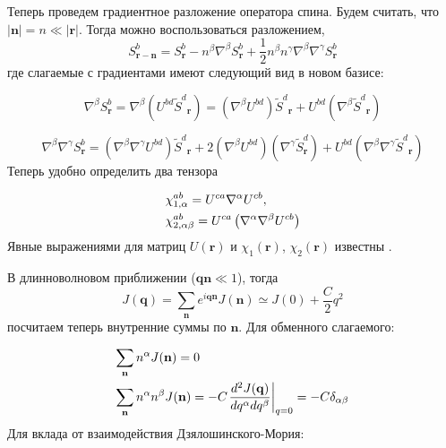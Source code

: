 \documentclass[a4paper,article,14pt]{extarticle}
\begin{document}
Теперь проведем градиентное разложение оператора спина. Будем считать, что $|\mathbf{n}|=n \ll |\mathbf{r}|$. Тогда можно воспользоваться разложением, $${S}_{{\mathbf{r}} - {\mathbf{n}}}^b = {S}_{\mathbf{r}}^b - {n^\beta }{\nabla ^\beta }{S}_{\mathbf{r}}^b + \frac{1}{2}{n^\beta }{n^\gamma }{\nabla ^\beta }{\nabla ^\gamma }{S}_{\mathbf{r}}^b$$ где слагаемые с градиентами имеют следующий вид в новом базисе:

\[{\nabla ^\beta }S_{\mathbf{r}}^b = {\nabla ^\beta }\left( {{U^{bd}}{{\tilde S}^d}_{\mathbf{r}}} \right) = \left( {{\nabla ^\beta }{U^{bd}}} \right){{\tilde S}^d}_{\mathbf{r}} + {U^{bd}}\left( {{\nabla ^\beta }{{\tilde S}^d}_{\mathbf{r}}} \right)\]

	
\[{\nabla ^\beta }{\nabla ^\gamma }S_{\mathbf{r}}^b = \left( {{\nabla ^\beta }{\nabla ^\gamma }{U^{bd}}} \right){\tilde S^d}_{\mathbf{r}} + 2\left( {{\nabla ^\beta }{U^{bd}}} \right)\left( {{\nabla ^\gamma }\tilde S_{\mathbf{r}}^d} \right) + {U^{bd}}\left( {{\nabla ^\beta }{\nabla ^\gamma }{{\tilde S}^d}_{\mathbf{r}}} \right)\]
Теперь удобно определить два тензора

\begin{eqnarray}
\label{eq:chi}
\begin{gathered}
  \chi _{1,\alpha }^{ab} = {U^{ca}}{\nabla ^\alpha }{U^{cb}}, \hfill \\
  \chi _{2,\alpha \beta }^{ab} = {U^{ca}}\left( {{\nabla ^\alpha }{\nabla ^\beta }{U^{cb}}} \right) \hfill \\ 
\end{gathered}
\end{eqnarray}
Явные выражениями для матриц $U(\mathbf{r})$ и $\chi_1(\mathbf{r})$, $\chi_2(\mathbf{r})$ известны \cite{paper:aristov}.

В длинноволновом приближении (${\mathbf{qn}} \ll 1$), тогда 
\[J({\mathbf{q}}) = \sum\limits_{\mathbf{n}} {{e^{i{\mathbf{qn}}}}J({\mathbf{n}})}  \simeq J(0) + \frac{C}{2}{q^2}\]
посчитаем теперь внутренние суммы по $\mathbf{n}$. Для обменного слагаемого:

\begin{eqnarray}
\label{eq:integrExch}
\begin{gathered}
  \sum\limits_{\mathbf{n}} {{n^\alpha }J({\mathbf{n}})}  = 0 \hfill \\
  \sum\limits_{\mathbf{n}} {{n^\alpha }{n^\beta }J({\mathbf{n}})}  =  - C{\left. {\frac{{{d^2}J({\mathbf{q}})}}{{d{q^\alpha }d{q^\beta }}}} \right|_{q = 0}} = - C{\delta _{\alpha \beta }} \hfill \\ 
\end{gathered}
\end{eqnarray}
Для вклада от взаимодействия Дзялошинского-Мория:
\end{document}
